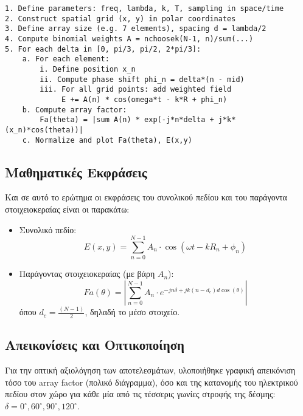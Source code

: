 \documentclass[a4paper,12pt]{report}
\newcommand{\en}{\selectlanguage{english}}
\newcommand{\gr}{\selectlanguage{greek}}
\begin{document}
\begin{tcolorbox}[colback=gray!5!white, colframe=black!75!black, title=Ψευδοκώδικας \en \texttt{Binomial\_Array\_Sim} \gr]
\en
\begin{verbatim}
1. Define parameters: freq, lambda, k, T, sampling in space/time
2. Construct spatial grid (x, y) in polar coordinates
3. Define array size (e.g. 7 elements), spacing d = lambda/2
4. Compute binomial weights A = nchoosek(N-1, n)/sum(...)
5. For each delta in [0, pi/3, pi/2, 2*pi/3]:
    a. For each element:
        i. Define position x_n
        ii. Compute phase shift phi_n = delta*(n - mid)
        iii. For all grid points: add weighted field
             E += A(n) * cos(omega*t - k*R + phi_n)
    b. Compute array factor:
        Fa(theta) = |sum A(n) * exp(-j*n*delta + j*k*(x_n)*cos(theta))|
    c. Normalize and plot Fa(theta), E(x,y)
\end{verbatim}
\gr
\end{tcolorbox}

\subsection{Μαθηματικές Εκφράσεις}
Και σε αυτό το ερώτημα οι εκφράσεις του συνολικού πεδίου και του παράγοντα στοιχειοκεραίας είναι οι παρακάτω:

\begin{itemize}
    \item Συνολικό πεδίο:
    \[
    E(x, y) = \sum_{n=0}^{N-1} A_n \cdot \cos\left( \omega t - k R_n + \phi_n \right)
    \]
    \item Παράγοντας στοιχειοκεραίας (με βάρη \( A_n \)):
    \[
    Fa(\theta) = \left| \sum_{n=0}^{N-1} A_n \cdot e^{-j n \delta + j k (n - d_c) d \cos(\theta)} \right|
    \]
    όπου \( d_c = \frac{(N-1)}{2} \), δηλαδή το μέσο στοιχείο.
\end{itemize}

\subsection{Απεικονίσεις και Οπτικοποίηση}

Για την οπτική αξιολόγηση των αποτελεσμάτων, υλοποιήθηκε γραφική απεικόνιση τόσο του \en array factor \gr (πολικό διάγραμμα), όσο και της κατανομής του ηλεκτρικού πεδίου στον χώρο για κάθε μία από τις τέσσερις γωνίες στροφής της δέσμης: \( \delta = 0^\circ, 60^\circ, 90^\circ, 120^\circ \).

\vspace{0.3cm}
\end{document}
